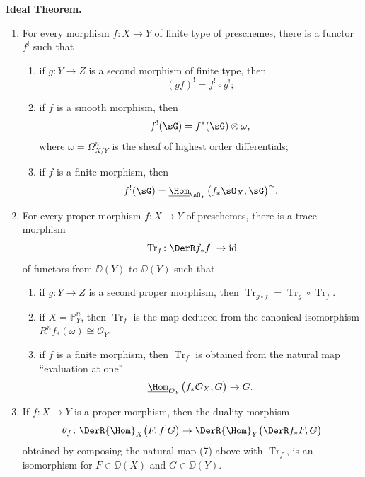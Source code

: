 \bigskip
\noindent
\textbf{Ideal Theorem.}
\begin{enumerate}
	\item[(a)] For every morphism $f\colon X\to Y$ of finite type of preschemes, there is a functor $f^{!}$ such that
	\begin{enumerate}
		\item[1)] if $g\colon Y\to Z$ is a second morphism of finite type, then
		\[
		(gf)^{!}=f^{!}\circ g^{!};
		\]
		\item[2)] if $f$ is a smooth morphism, then
		\[
		f^{!}(\sG)=f^{*}(\sG)\otimes\omega,
		\]
		where $\omega=\Omega_{X/Y}^{n}$ is the sheaf of highest order differentials;
		\item[3)] if $f$ is a finite morphism, then
		\[
		f^{!}(\sG)=\underline{\Hom}_{\sO_{Y}}\bigl(f_{*}\sO_{X},\sG\bigr)^{\sim}.
		\]
	\end{enumerate}

\item[(b)] For every proper morphism $f\colon X\to Y$ of preschemes, there is a trace morphism
\[
\operatorname{Tr}_{f}\colon \DerR f_{*}f^{!}\to\operatorname{id}
\]
of functors from $\DD(Y)$ to $\DD(Y)$ such that
\begin{enumerate}
	\item[1)] if $g\colon Y\to Z$ is a second proper morphism, then $\operatorname{Tr}_{g\circ f}=\operatorname{Tr}_{g}\circ\operatorname{Tr}_{f}$.
	\item[2)] if $X=\mathbb{P}_{Y}^{n}$, then $\operatorname{Tr}_{f}$ is the map deduced from the canonical isomorphism $R^{n}f_{*}(\omega)\cong\mathcal{O}_{Y}$.
	\item[3)] if $f$ is a finite morphism, then $\operatorname{Tr}_{f}$ is obtained from the natural map ``evaluation at one''
	\[
	\underline{\Hom}_{\mathcal{O}_Y}\bigl(f_{*}\mathcal{O}_{X},G\bigr)\to G.
	\]
\end{enumerate}

\smallskip
\item[(c)] If $f\colon X\to Y$ is a proper morphism, then the duality morphism
\[
\theta_{f}\colon \DerR{\Hom}_{X}\bigl(F,f^{!}G\bigr)\to \DerR{\Hom}_{Y}\bigl(\DerR f_{*}F,G\bigr)
\]
obtained by composing the natural map (7) above with $\operatorname{Tr}_{f}$, is an isomorphism for $F\in \DD(X)$ and $G\in \DD(Y)$.

\bigskip
	
\end{enumerate}


